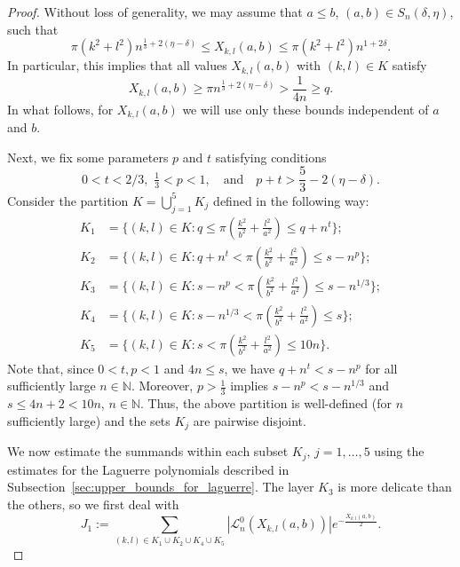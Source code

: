 \documentclass[10pt,a4paper]{amsart}
\newcommand{\N}{{\mathbb N}}
\begin{document}
\begin{proof}
    Without loss of generality, we may assume that $a \leq b$, $(a,b) \in S_n(\delta, \eta)$, such that 
    \begin{equation}\label{eq:X_uniform_bounds_reminder}
        \pi (k^2 + l^2) n^{\frac{1}{3}+2(\eta - \delta)} 
        \leq X_{k,l}(a,b)
        \leq \pi (k^2 + l^2) n^{1+2\delta}.
    \end{equation}
    In particular, this implies that all values $ X_{k,l}(a,b)$ with $(k,l) \in K$ satisfy
    \begin{equation}\label{eq:min_point}
        X_{k,l}(a,b) \geq \pi n^{\frac{1}{3}+2(\eta - \delta)}>\frac{1}{4n}\geq q.
    \end{equation}
    In what follows,  for $X_{k,l}(a,b)$ we will use only these bounds independent of $a$ and $b$.
    
    Next, we fix some parameters $p$ and $t$ satisfying conditions
    \begin{equation}\label{eq:p_t_cond}
        0<t<2/3, \,\, \tfrac{1}{3}<p<1,\quad \text{and} \quad     p+t > \frac{5}{3}-2(\eta - \delta).   
    \end{equation}
    Consider the partition $K = \bigcup_{j=1}^5 K_j$ defined in the following way: 
    \begin{align}
        K_1 &= \{(k,l)\in K: q\leq \pi(\tfrac{k^2}{b^2}+\tfrac{l^2}{a^2})\leq q+n^{t}\}; \\
        K_2 &= \{(k,l)\in K: q+n^{t}< \pi(\tfrac{k^2}{b^2}+\tfrac{l^2}{a^2})\leq s-n^{p}\}; \\
        K_3 &= \{(k,l)\in K: s-n^{p}< \pi(\tfrac{k^2}{b^2}+\tfrac{l^2}{a^2})\leq s-n^{1/3}\}; \\
        K_4 &= \{(k,l)\in K: s-n^{1/3} <\pi(\tfrac{k^2}{b^2}+\tfrac{l^2}{a^2})\leq s\}; \\
        K_5 &= \{(k,l)\in K: s <\pi(\tfrac{k^2}{b^2}+\tfrac{l^2}{a^2})\leq {10}n\}.
    \end{align} 
    Note that, since $0<t,p<1$ and $4n \leq s$, we have $q+n^t<s-n^p$ for all sufficiently large $n\in\N$. Moreover, $p>\frac13$ implies $s-n^p<s-n^{1/3}$ and $s \leq 4n+2 < 10n$, $n \in \N$. Thus, the above partition is well-defined (for $n$ sufficiently large) and the sets $K_j$ are pairwise disjoint.
        
    We now estimate the summands within each subset $K_j, \, j=1, \dots,5$ using the estimates for the Laguerre polynomials described in Subsection~\ref{sec:upper_bounds_for_laguerre}. The layer $K_3$ is more delicate than the others, so we first deal with
    \begin{equation}
        J_1:=\sum_{(k,l)\in K_1\cup K_2 \cup K_4\cup K_5} |\mathcal{L}_n^{0}(X_{k,l}(a,b))|e^{-\frac{X_{k,l}(a,b)}{2}}.
    \end{equation}
    

\end{proof}
\end{document}
